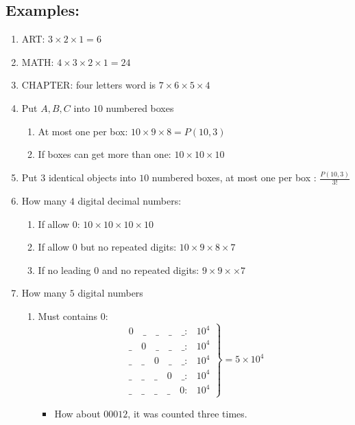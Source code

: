 \documentclass[a4paper]{article}
\begin{document}
\subsection*{Examples:}
\begin{enumerate}
    \item ART: $3\times 2\times 1=6$
    \item MATH: $4\times 3\times 2\times 1 = 24$
    \item CHAPTER: four letters word is $7\times 6\times 5\times 4$
    \item Put $A,B,C$ into $10$ numbered boxes
    \begin{enumerate}
        \item At most one per box: $10 \times 9\times 8=P(10,3)$
        \item If boxes can get more than one: $10\times 10 \times 10$
    \end{enumerate}
    \item Put $3$ identical objects into $10$ numbered boxes, at most one per box : $\frac{P(10,3)}{3!}$
    \item How many $4$ digital decimal numbers:
    \begin{enumerate}
        \item If allow $0$: $10\times 10\times 10\times 10$
        \item If allow $0$ but no repeated digits: $10\times 9\times 8\times 7$
        \item If no leading $0$ and no repeated digits: $9\times 9\times \times 7$
    \end{enumerate}
    \item How many $5$ digital numbers
    \begin{enumerate}
        \item Must contains $0$:\\
        $$
        \left.
            \begin{array}{ll}
            0\quad \_\quad \_\quad \_\quad \_:&10^4\\
            \_\quad 0\quad \_\quad \_\quad \_:&10^4\\
            \_\quad \_\quad 0\quad \_\quad \_:&10^4\\
            \_\quad \_\quad \_\quad 0\quad \_:&10^4\\
            \_\quad \_\quad \_\quad \_\quad 0:&10^4
            \end{array}
        \right\}
        =5\times10^4
        $$
        \begin{itemize}
            \item How about $00012$, it was counted three times.

\end{itemize}
\end{enumerate}
\end{enumerate}
\end{document}
